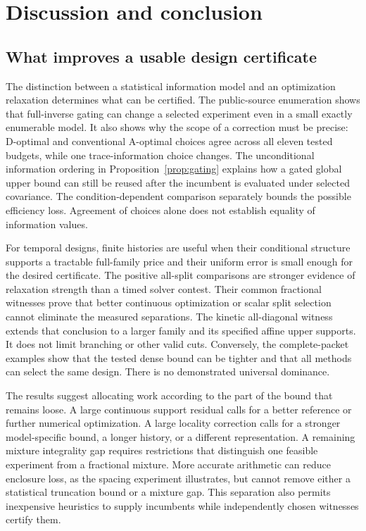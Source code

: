 \section{Discussion and conclusion}\label{sec:discussion}

\subsection{What improves a usable design certificate}

The distinction between a statistical information model and an optimization
relaxation determines what can be certified. The public-source enumeration
shows that full-inverse gating can change a selected experiment even in a
small exactly enumerable model. It also shows why the scope of a correction
must be precise: D-optimal and conventional A-optimal choices agree across all
eleven tested budgets, while one trace-information choice changes. The
unconditional information ordering in Proposition~\ref{prop:gating} explains
how a gated global upper bound can still be reused after the incumbent is
evaluated under selected covariance. The condition-dependent comparison
separately bounds the possible efficiency loss.
Agreement of choices alone does not establish equality of information values.

For temporal designs, finite histories are useful when their conditional
structure supports a tractable full-family price and their uniform error is
small enough for the desired certificate. The positive all-split comparisons
are stronger evidence of relaxation strength than a timed solver contest.
Their common fractional witnesses prove that better continuous optimization
or scalar split selection cannot eliminate the measured separations. The
kinetic all-diagonal witness extends that conclusion to a larger family and
its specified affine upper supports. It does not limit branching or other
valid cuts. Conversely, the complete-packet examples show that the tested
dense bound can be tighter and that all methods can select the same design.
There is no demonstrated universal dominance.

The results suggest allocating work according to the part of the bound that
remains loose. A large continuous support residual calls for a better reference
or further numerical optimization. A large locality correction calls for a
stronger model-specific bound, a longer history, or a different representation.
A remaining mixture integrality gap requires restrictions that distinguish
one feasible experiment from a fractional mixture. More accurate arithmetic
can reduce enclosure loss, as the spacing experiment illustrates, but cannot
remove either a statistical truncation bound or a mixture gap. This separation
also permits inexpensive heuristics to supply incumbents while independently
chosen witnesses certify them.

